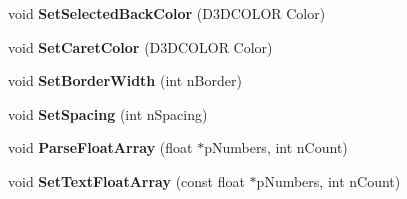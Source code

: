 \begin{DoxyCompactItemize}
\item 
\hypertarget{class_c_d_x_u_t_edit_box_ae43b2c8142d3ce9602ae73193b0982fe}{void {\bfseries Set\+Selected\+Back\+Color} (D3\+D\+C\+O\+L\+O\+R Color)}\label{class_c_d_x_u_t_edit_box_ae43b2c8142d3ce9602ae73193b0982fe}

\item 
\hypertarget{class_c_d_x_u_t_edit_box_afb8d2b7593862e875daf4b4a63080ddf}{void {\bfseries Set\+Caret\+Color} (D3\+D\+C\+O\+L\+O\+R Color)}\label{class_c_d_x_u_t_edit_box_afb8d2b7593862e875daf4b4a63080ddf}

\item 
\hypertarget{class_c_d_x_u_t_edit_box_af9b5c04a9cdda81761cc04d7e70a6a06}{void {\bfseries Set\+Border\+Width} (int n\+Border)}\label{class_c_d_x_u_t_edit_box_af9b5c04a9cdda81761cc04d7e70a6a06}

\item 
\hypertarget{class_c_d_x_u_t_edit_box_ada1e5253fd1df390a9536cd111ed0121}{void {\bfseries Set\+Spacing} (int n\+Spacing)}\label{class_c_d_x_u_t_edit_box_ada1e5253fd1df390a9536cd111ed0121}

\item 
\hypertarget{class_c_d_x_u_t_edit_box_a7a3810c8c3ee8f44a87451fd0d3ce127}{void {\bfseries Parse\+Float\+Array} (float $\ast$p\+Numbers, int n\+Count)}\label{class_c_d_x_u_t_edit_box_a7a3810c8c3ee8f44a87451fd0d3ce127}

\item 
\hypertarget{class_c_d_x_u_t_edit_box_a97571e11cb7c2a19e3cf35239a8ff44e}{void {\bfseries Set\+Text\+Float\+Array} (const float $\ast$p\+Numbers, int n\+Count)}\label{class_c_d_x_u_t_edit_box_a97571e11cb7c2a19e3cf35239a8ff44e}

\end{DoxyCompactItemize}
